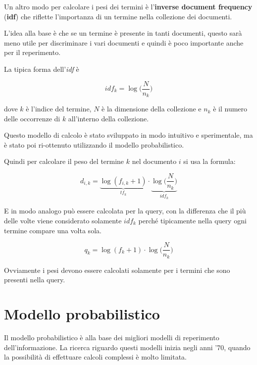 

Un altro modo per calcolare i pesi dei termini è l'\textbf{inverse document frequency} (\textbf{idf}) che riflette l'importanza di un termine nella collezione dei documenti.

L'idea alla base è che se un termine è presente in tanti documenti, questo sarà meno utile per discriminare i vari documenti e quindi è poco importante anche per il reperimento.

La tipica forma dell'\textit{idf} è

$$
idf_k = \log\bigg(\frac{N}{n_k}\bigg)
$$

\noindent dove $k$ è l'indice del termine, $N$ è la dimensione della collezione e $n_k$ è il numero delle occorrenze di $k$ all'interno della collezione.

Questo modello di calcolo è stato sviluppato in modo intuitivo e sperimentale, ma è stato poi ri-ottenuto utilizzando il modello probabilistico.

Quindi per calcolare il peso del termine $k$ nel documento $i$ si usa la formula:

$$
d_{i,k} = \underbrace{\log (f_{i,k} +1 )}_{tf_k} \cdot \underbrace{\log\bigg(\frac{N}{n_k}\bigg)}_{idf_k}
$$

\noindent E in modo analogo può essere calcolata per la query, con la differenza che il più delle volte viene considerato solamente $idf_k$ perché tipicamente nella query ogni termine compare una volta sola.

$$
q_k = \log(f_k +1 )\cdot \log \bigg(\frac{N}{n_k}\bigg)
$$

\noindent Ovviamente i pesi devono essere calcolati solamente per i termini che sono presenti nella query.

\section{Modello probabilistico}

Il modello probabilistico è alla base dei migliori modelli di reperimento dell'informazione.
La ricerca riguardo questi modelli inizia negli anni '70, quando la possibilità di effettuare calcoli complessi è molto limitata.

